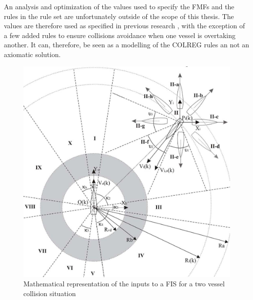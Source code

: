 An analysis and optimization of the values used to specify the FMFs and the rules in the rule set are unfortunately outside of the scope of this thesis. The values are therefore used as specified in previous research \cite{perera2012intelligent}, with the exception of a few added rules to ensure collisions avoidance when one vessel is overtaking another. It can, therefore, be seen as a modelling of the COLREG rules an not an axiomatic solution.


\begin{figure}[H]
    \centering
    \includegraphics[width=\linewidth]{Figures/model}
    \caption{Mathematical representation of the inputs to a FIS for a two vessel collision situation\cite{perera2012intelligent}}
    \label{fig:model}
\end{figure}

